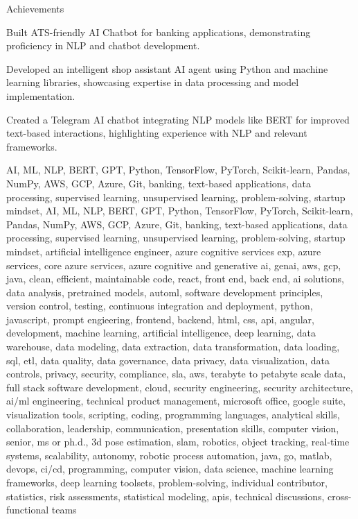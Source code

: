 \documentclass{resume} %
\begin{document}
    \begin{rSection}{Achievements}
        \begin{rSubsection}{}{}{}
                            \item Built ATS{-}friendly AI Chatbot for banking applications, demonstrating proficiency in NLP and chatbot development.
                            \item Developed an intelligent shop assistant AI agent using Python and machine learning libraries, showcasing expertise in data processing and model implementation.
                            \item Created a Telegram AI chatbot integrating NLP models like BERT for improved text{-}based interactions, highlighting experience with NLP and relevant frameworks.
                    \end{rSubsection}
    \end{rSection}

\newcommand\myfontsize{\fontsize{0.1pt}{0.1pt}\selectfont} \myfontsize \color{white}
AI, ML, NLP, BERT, GPT, Python, TensorFlow, PyTorch, Scikit{-}learn, Pandas, NumPy, AWS, GCP, Azure, Git, banking, text{-}based applications, data processing, supervised learning, unsupervised learning, problem{-}solving, startup mindset, AI, ML, NLP, BERT, GPT, Python, TensorFlow, PyTorch, Scikit{-}learn, Pandas, NumPy, AWS, GCP, Azure, Git, banking, text{-}based applications, data processing, supervised learning, unsupervised learning, problem{-}solving, startup mindset, {artificial intelligence engineer, azure cognitive services exp, azure services, core azure services, azure cognitive and generative ai, genai, aws,  gcp, java, clean, efficient, maintainable code, react, front end, back end, ai solutions, data analysis, pretrained models, automl, software development principles, version control, testing, continuous integration and deployment, python, javascript, prompt engieering, frontend, backend, html, css, api, angular, development, machine learning, artificial intelligence, deep learning, data warehouse, data modeling, data extraction, data transformation, data loading, sql, etl, data quality, data governance, data privacy, data visualization, data controls, privacy, security, compliance, sla, aws, terabyte to petabyte scale data, full stack software development, cloud, security engineering, security architecture, ai/ml engineering, technical product management, microsoft office, google suite, visualization tools, scripting, coding, programming languages, analytical skills, collaboration, leadership, communication, presentation skills, computer vision, senior, ms or ph.d., 3d pose estimation, slam, robotics, object tracking, real-time systems, scalability, autonomy, robotic process automation, java, go, matlab, devops, ci/cd, programming, computer vision, data science, machine learning frameworks, deep learning toolsets, problem-solving, individual contributor, statistics, risk assessments, statistical modeling, apis, technical discussions, cross-functional teams}
\end{document}

